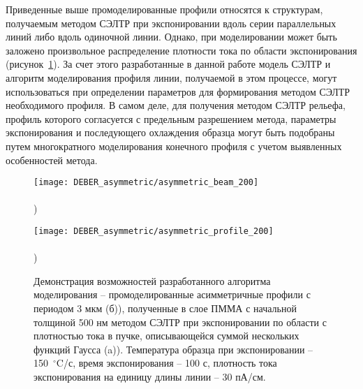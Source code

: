 Приведенные выше промоделированные профили относятся к структурам, получаемым методом СЭЛТР при экспонировании вдоль серии параллельных линий либо вдоль одиночной линии.
Однако, при моделировании может быть заложено произвольное распределение плотности тока по области экспонирования (рисунок~\ref{fig:DEBER_multibeam}).
За счет этого разработанные в данной работе модель СЭЛТР и алгоритм моделирования профиля линии, получаемой в этом процессе, могут использоваться при определении параметров для формирования методом СЭЛТР необходимого профиля.
В самом деле, для получения методом СЭЛТР рельефа, профиль которого согласуется с предельным разрешением метода, параметры экспонирования и последующего охлаждения образца могут быть подобраны путем многократного моделирования конечного профиля с учетом выявленных особенностей метода.

\begin{figure}[h]	
	\begin{minipage}{0.48\textwidth}
		\texttt{[image: DEBER\_asymmetric/asymmetric\_beam\_200]} \\
		\vspace{-12em} \\ ) \\ \vspace{12em}
	\end{minipage}
	\begin{minipage}{0.48\textwidth}
		\texttt{[image: DEBER\_asymmetric/asymmetric\_profile\_200]} \\
		\vspace{-12em} \\ ) \\ \vspace{12em}
	\end{minipage}
	\vspace{-3.5em}
	\caption{Демонстрация возможностей разработанного алгоритма моделирования -- промоделированные асимметричные профили с периодом 3 мкм (б)), полученные в слое ПММА с начальной толщиной 500 нм методом СЭЛТР при экспонировании по области с плотностью тока в пучке, описывающейся суммой нескольких функций Гаусса (a)). Температура образца при экспонировании -- 150~$^\circ$C/с, время экспонирования -- 100 с, плотность тока экспонирования на единицу длины линии -- 30 пА/см.}
	\label{fig:DEBER_multibeam}
\end{figure}
